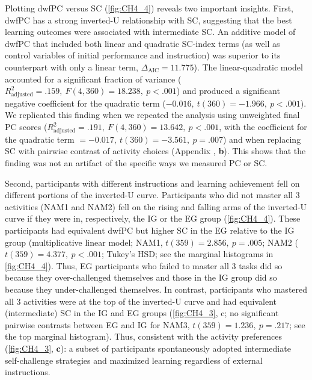 Plotting \ac{dwfPC} versus \ac{SC} (\cref{fig:CH4_4}) reveals two important insights. First, \ac{dwfPC} has a strong inverted-U relationship with \ac{SC}, suggesting that the best learning outcomes were associated with intermediate \ac{SC}. An additive model of \ac{dwfPC} that included both linear and quadratic \ac{SC}-index terms (as well as control variables of initial performance and instruction) was superior to its counterpart with only a linear term, $\Delta_{\text{AIC}} = 11.775$). The linear-quadratic model accounted for a significant fraction of variance ($R_{\text{adjusted}}^2 = .159,\ F(4,360) = 18.238,\ p < .001$) and produced a significant negative coefficient for the quadratic term ($-0.016,\ t(360) = -1.966,\ p < .001$). We replicated this finding when we repeated the analysis using unweighted final \ac{PC} scores  ($R_{\text{adjusted}}^2 = .191,\ F(4,360) = 13.642,\ p < .001$, with the coefficient for the quadratic term $=-0.017,\ t(360) = -3.561,\ p = .007$) and when replacing \ac{SC} with pairwise contrast of activity choices (Appendix , \textbf{b}). This shows that the finding was not an artifact of the specific ways we measured \ac{PC} or \ac{SC}.

Second, participants with different instructions and learning achievement fell on different portions of the inverted-U curve. Participants who did not master all 3 activities  (\ac{NAM}1 and \ac{NAM}2) fell on the rising and falling arms of the inverted-U curve if they were in, respectively, the \ac{IG} or the \ac{EG} group (\cref{fig:CH4_4}). These participants had equivalent \ac{dwfPC} but higher \ac{SC} in the \ac{EG} relative to the \ac{IG} group (multiplicative linear model;  \ac{NAM}1, $t(359) = 2.856,\ p = .005$; \ac{NAM}2 ($t(359) = 4.377,\ p < .001$; Tukey's HSD; see the marginal histograms in \cref{fig:CH4_4}). Thus, \ac{EG} participants who failed to master all 3 tasks did so because they over-challenged themselves and those in the \ac{IG} group did so because they under-challenged themselves. In contrast, participants who mastered all 3 activities were at the top of the inverted-U curve and had equivalent (intermediate) \ac{SC} in the \ac{IG} and \ac{EG} groups (\cref{fig:CH4_3}, c; no significant pairwise contrasts between \ac{EG} and \ac{IG} for \ac{NAM}3, $t(359) = 1.236,\ p = .217$; see the top marginal histogram). Thus, consistent with the activity preferences (\cref{fig:CH4_3}, \textbf{c}): a subset of participants spontaneously adopted intermediate self-challenge strategies and maximized learning regardless of external instructions. 

